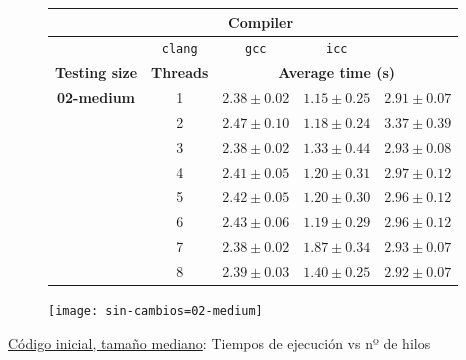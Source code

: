 \begin{figure}[H]
    \centering
    \begin{subfigure}{0.4\textwidth}
        \begin{adjustbox}{width=\textwidth} 
        \begin{tabular}{|c|c|c|c|c|}
            \hline
            \rowcolor{azul} \multicolumn{2}{|c|}{}&\multicolumn{3}{c|}{\textbf{Compiler}} \\ \hline
            \rowcolor{azul} \multicolumn{2}{|c|}{}&\texttt{clang}&\texttt{gcc}&\texttt{icc}\\ \hline
            \rowcolor{azul} \textbf{Testing size} & \textbf{Threads}&\multicolumn{3}{c|}{\textbf{Average time (s)}} \\ \hline
            \multirow{8}{2.5cm}{\textbf{02-medium}} & 1 & \(2.38\pm{0.02}\) & \(1.15\pm{0.25}\) & \(2.91\pm{0.07}\) \\ \cline{2-5}
            & 2 & \(2.47\pm{0.10}\) & \(1.18\pm{0.24}\) & \(3.37\pm{0.39}\) \\ \cline{2-5}
            & 3 & \(2.38\pm{0.02}\) & \(1.33\pm{0.44}\) & \(2.93\pm{0.08}\) \\ \cline{2-5}
            & 4 & \(2.41\pm{0.05}\) & \(1.20\pm{0.31}\) & \(2.97\pm{0.12}\) \\ \cline{2-5}
            & 5 & \(2.42\pm{0.05}\) & \(1.20\pm{0.30}\) & \(2.96\pm{0.12}\) \\ \cline{2-5}
            & 6 & \(2.43\pm{0.06}\) & \(1.19\pm{0.29}\) & \(2.96\pm{0.12}\) \\ \cline{2-5}
            & 7 & \(2.38\pm{0.02}\) & \(1.87\pm{0.34}\) & \(2.93\pm{0.07}\) \\ \cline{2-5}
            & 8 & \(2.39\pm{0.03}\) & \(1.40\pm{0.25}\) & \(2.92\pm{0.07}\) \\ \hline
        \end{tabular}
        \end{adjustbox}
    \end{subfigure}
    \hfill
    \begin{subfigure}{0.5\textwidth}
        \texttt{[image: sin-cambios=02-medium]}
    \end{subfigure}
    \caption{\underline{Código inicial, tamaño mediano}: Tiempos de ejecución vs nº de hilos}
    \label{sin-cambios=02-medium}
\end{figure}

